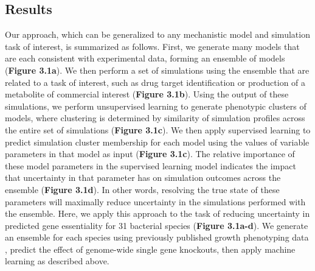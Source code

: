 \documentclass[11pt,twocolumn,notitlepage,openany,twoside]{book}
\begin{document}
\begin{refsection}
\section{Results}

Our approach, which can be generalized to any mechanistic model and simulation task of interest, is summarized as follows. First, we generate many models that are each consistent with experimental data, forming an ensemble of models (\textbf{Figure 3.1a}). We then perform a set of simulations using the ensemble that are related to a task of interest, such as drug target identification or production of a metabolite of commercial interest (\textbf{Figure 3.1b}). Using the output of these simulations, we perform unsupervised learning to generate phenotypic clusters of models, where clustering is determined by similarity of simulation profiles across the entire set of simulations (\textbf{Figure 3.1c}). We then apply supervised learning to predict simulation cluster membership for each model using the values of variable parameters in that model as input (\textbf{Figure 3.1c}). The relative importance of these model parameters in the supervised learning model indicates the impact that uncertainty in that parameter has on simulation outcomes across the ensemble (\textbf{Figure 3.1d}). In other words, resolving the true state of these parameters will maximally reduce uncertainty in the simulations performed with the ensemble. Here, we apply this approach to the task of reducing uncertainty in predicted gene essentiality for 31 bacterial species (\textbf{Figure 3.1a-d}). We generate an ensemble for each species using previously published growth phenotyping data \cite{Plata2015-bc}, predict the effect of genome-wide single gene knockouts, then apply machine learning as described above.


\end{refsection}
\end{document}
